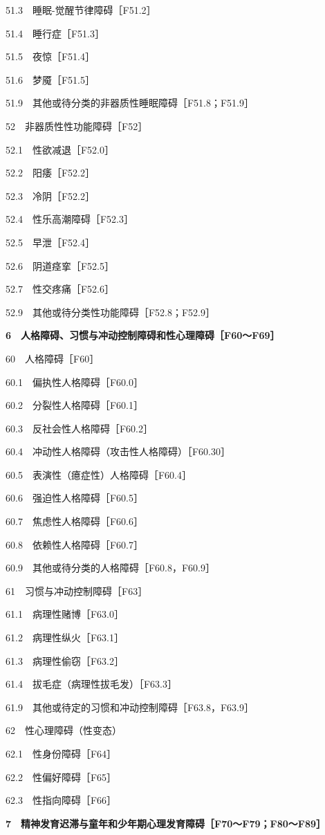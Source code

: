 51.3　睡眠-觉醒节律障碍［F51.2］

51.4　睡行症［F51.3］

51.5　夜惊［F51.4］

51.6　梦魇［F51.5］

51.9　其他或待分类的非器质性睡眠障碍［F51.8；F51.9］

52　非器质性性功能障碍［F52］

52.1　性欲减退［F52.0］

52.2　阳痿［F52.2］

52.3　冷阴［F52.2］

52.4　性乐高潮障碍［F52.3］

52.5　早泄［F52.4］

52.6　阴道痉挛［F52.5］

52.7　性交疼痛［F52.6］

52.9　其他或待分类性功能障碍［F52.8；F52.9］

\textbf{6　人格障碍、习惯与冲动控制障碍和性心理障碍［F60～F69］}

60　人格障碍［F60］

60.1　偏执性人格障碍［F60.0］

60.2　分裂性人格障碍［F60.1］

60.3　反社会性人格障碍［F60.2］

60.4　冲动性人格障碍（攻击性人格障碍）［F60.30］

60.5　表演性（癔症性）人格障碍［F60.4］

60.6　强迫性人格障碍［F60.5］

60.7　焦虑性人格障碍［F60.6］

60.8　依赖性人格障碍［F60.7］

60.9　其他或待分类的人格障碍［F60.8，F60.9］

61　习惯与冲动控制障碍［F63］

61.1　病理性赌博［F63.0］

61.2　病理性纵火［F63.1］

61.3　病理性偷窃［F63.2］

61.4　拔毛症（病理性拔毛发）［F63.3］

61.9　其他或待定的习惯和冲动控制障碍［F63.8，F63.9］

62　性心理障碍（性变态）

62.1　性身份障碍［F64］

62.2　性偏好障碍［F65］

62.3　性指向障碍［F66］

\textbf{7　精神发育迟滞与童年和少年期心理发育障碍［F70～F79；F80～F89］}

